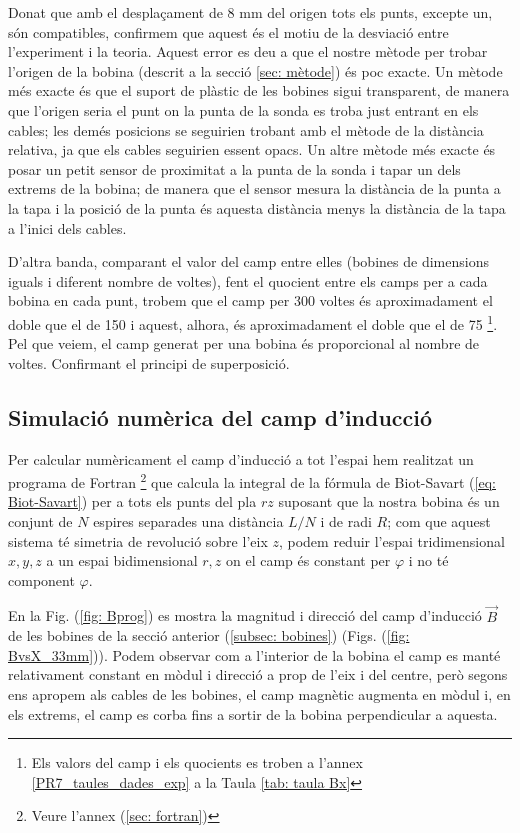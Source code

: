 \documentclass[11pt]{article}
\numberwithin{equation}{section}
\numberwithin{figure}{section}
\numberwithin{table}{section}
\begin{document}
Donat que amb el desplaçament de 8 mm del origen tots els punts, excepte un, són compatibles, confirmem que aquest és el motiu de la desviació entre l'experiment i la teoria. Aquest error es deu a que el nostre mètode per trobar l'origen de la bobina (descrit a la secció \ref{sec: mètode}) és poc exacte. Un mètode més exacte és que el suport de plàstic de les bobines sigui transparent, de manera que l'origen seria el punt on la punta de la sonda es troba just entrant en els cables; les demés posicions se seguirien trobant amb el mètode de la distància relativa, ja que els cables seguirien essent opacs. Un altre mètode més exacte és posar un petit sensor de proximitat a la punta de la sonda i tapar un dels extrems de la bobina; de manera que el sensor mesura la distància de la punta a la tapa i la posició de la punta és aquesta distància menys la distància de la tapa a l'inici dels cables.

D'altra banda, comparant el valor del camp entre elles (bobines de dimensions iguals i diferent nombre de voltes), fent el quocient entre els camps per a cada bobina en cada punt, trobem que el camp per 300 voltes és aproximadament el doble que el de 150 i aquest, alhora, és aproximadament el doble que el de 75 \footnote{Els valors del camp i els quocients es troben a l'annex \ref{PR7_taules_dades_exp} a la Taula \ref{tab: taula Bx}}. Pel que veiem, el camp generat per una bobina és proporcional al nombre de voltes. Confirmant el principi de superposició.


\subsection{Simulació numèrica del camp d'inducció} \label{sec: programa}
Per calcular numèricament el camp d'inducció a tot l'espai hem realitzat un programa de Fortran \footnote{Veure l'annex (\ref{sec: fortran})} que calcula la integral de la fórmula de Biot-Savart (\ref{eq: Biot-Savart}) per a tots els punts del pla $rz$ suposant que la nostra bobina és un conjunt de $N$ espires separades una distància $L/N$ i de radi $R$; com que aquest sistema té simetria de revolució sobre l'eix $z$, podem reduir l'espai tridimensional $x, y, z$ a un espai bidimensional $r, z$ on el camp és constant per $\varphi$ i no té component $\varphi$.

En la Fig. (\ref{fig: Bprog}) es mostra la magnitud i direcció del camp d'inducció $\vec{B}$ de les bobines de la secció anterior (\ref{subsec: bobines}) (Figs. (\ref{fig: BvsX_33mm})). Podem observar com a l'interior de la bobina el camp es manté relativament constant en mòdul i direcció a prop de l'eix i del centre, però segons ens apropem als cables de les bobines, el camp magnètic augmenta en mòdul i, en els extrems, el camp es corba fins a sortir de la bobina perpendicular a aquesta.
\end{document}
